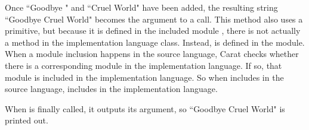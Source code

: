 Once ``Goodbye " and ``Cruel World" have been added, the resulting string ``Goodbye Cruel World" becomes the argument to a  call. This  method also uses a primitive, but because it is defined in the included module , there is not actually a  method in the implementation language  class. Instead,  is defined in the  module. When a module inclusion happens in the source language, Carat checks whether there is a corresponding module in the implementation language. If so, that module is included in the implementation language. So when  includes  in the source language,  includes  in the implementation language.

When  is finally called, it outputs its argument, so ``Goodbye Cruel World" is printed out.

